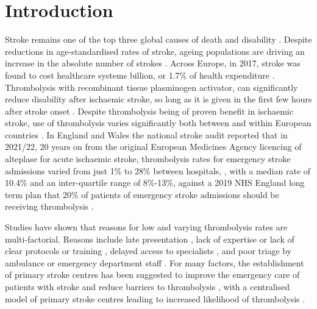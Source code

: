 \section{Introduction}



Stroke remains one of the top three global causes of death and disability \cite{feigin_global_2021}. Despite reductions in age-standardised rates of stroke, ageing populations are driving an increase in the absolute number of strokes \cite{feigin_global_2021}. Across Europe, in 2017, stroke was found to cost healthcare systems  billion, or 1.7\% of health expenditure \cite{luengo-fernandez_economic_2020}. Thrombolysis with recombinant tissue plasminogen activator, can significantly reduce disability after ischaemic stroke, so long as it is given in the first few hours after stroke onset \cite{emberson_effect_2014}. Despite thrombolysis being of proven benefit in ischaemic stroke, use of thrombolysis varies significantly both between and within European countries \cite{aguiar_de_sousa_access_2019}. In England and Wales the national stroke audit reported that in 2021/22, 20 years on from the original European Medicines Agency licencing of alteplase for acute ischaemic stroke, thrombolysis rates for emergency stroke admissions varied from just 1\% to 28\% between hospitals, \cite{sentinel_national_stroke_audit_programme_ssnap_2022}, with a median rate of 10.4\% and an inter-quartile range of 8\%-13\%, against a 2019 NHS England long term plan that 20\% of patients of emergency stroke admissions should be receiving thrombolysis \cite{nhs_long_term_plan_2019}.


Studies have shown that reasons for low and varying thrombolysis rates are multi-factorial. Reasons include late presentation \cite{aguiar_de_sousa_access_2019}, lack of expertise \cite{aguiar_de_sousa_access_2019} or lack of clear protocols or training \cite{carter-jones_stroke_2011}, delayed access to specialists \cite{kamal_delays_2017}, and poor triage by ambulance or emergency department staff \cite{carter-jones_stroke_2011}. For many factors, the establishment of primary stroke centres has been suggested to improve the emergency care of patients with stroke and reduce barriers to thrombolysis \cite{carter-jones_stroke_2011}, with a centralised model of primary stroke centres leading to increased likelihood of thrombolysis \cite{lahr_proportion_2012, morris_impact_2014, hunter_impact_2013}. 


